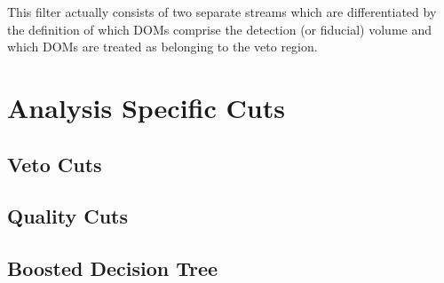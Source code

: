 \documentclass{gatech-thesis}
\begin{document}

This filter actually consists of two separate streams which are differentiated by the definition of which DOMs comprise the detection (or fiducial) volume and which DOMs are treated as belonging to the veto region.

\section{Analysis Specific Cuts}

\subsection{Veto Cuts}

\subsection{Quality Cuts}

\subsection{Boosted Decision Tree}
\end{document}
